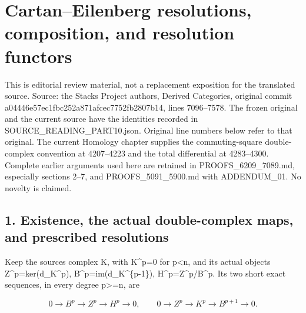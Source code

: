 \section{\texorpdfstring{Cartan–\allowbreak{}Eilenberg resolutions,\allowbreak{} composition,\allowbreak{} and resolution functors}{   and resolution functors}}\label{proofs-7096-7578-cartaneilenberg-resolutions-composition-and-resolution-functors}

This is editorial review material,\allowbreak{} not a replacement exposition for the translated source. Source:\allowbreak{} the Stacks Project authors,\allowbreak{} Derived Categories,\allowbreak{} original commit a04446e5\allowbreak{}7ec1fbc2\allowbreak{}52a871af\allowbreak{}cec7752f\allowbreak{}b2807b14, lines 7096–\allowbreak{}7578. The frozen original and the current source have the identities recorded in SOURCE\_\allowbreak{}READING\_\allowbreak{}PART10.json. Original line numbers below refer to that original. The current Homology chapter supplies the commuting-square double-complex convention at 4207–\allowbreak{}4223 and the total differential at 4283–\allowbreak{}4300. Complete earlier arguments used here are retained in PROOFS\_\allowbreak{}6209\_\allowbreak{}7089.md,\allowbreak{} especially sections 2–\allowbreak{}7,\allowbreak{} and PROOFS\_\allowbreak{}5091\_\allowbreak{}5900.md with ADDENDUM\_\allowbreak{}01. No novelty is claimed.

\subsection{\texorpdfstring{1. Existence,\allowbreak{} the actual double-complex maps,\allowbreak{} and prescribed resolutions}{1.  the actual double-complex  and prescribed resolutions}}\label{proofs-7096-7578-existence-the-actual-double-complex-maps-and-prescribed-resolutions}

Keep the source\textquotesingle s complex K,\allowbreak{} with K\textasciicircum{}p\allowbreak{}=0 for p<n,\allowbreak{} and its actual objects Z\textasciicircum{}p\allowbreak{}=ker(d\_\allowbreak{}K\textasciicircum{}p)\allowbreak{},\allowbreak{} B\textasciicircum{}p\allowbreak{}=im(d\_\allowbreak{}K\textasciicircum{}\{p-1\})\allowbreak{},\allowbreak{} H\textasciicircum{}p\allowbreak{}=Z\textasciicircum{}p/\allowbreak{}B\textasciicircum{}p. Its two short exact sequences,\allowbreak{} in every degree p>\allowbreak{}=n,\allowbreak{} are

\[
 0\longrightarrow B^p\longrightarrow Z^p\longrightarrow H^p
       \longrightarrow0,\qquad
 0\longrightarrow Z^p\longrightarrow K^p\longrightarrow B^{p+1}
       \longrightarrow0.                                      \tag{1.1}
\]

